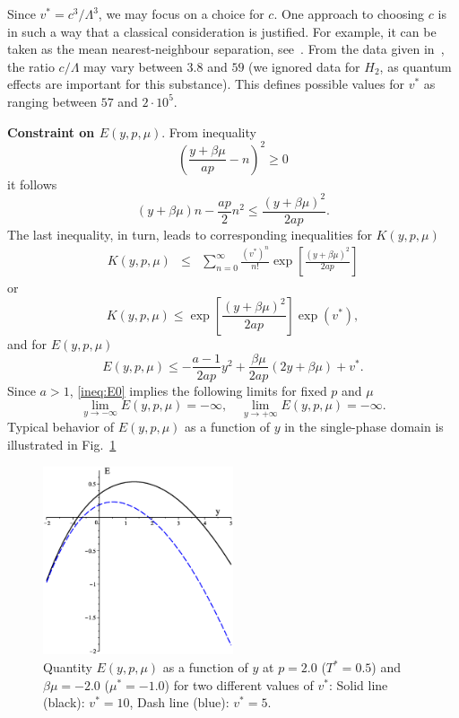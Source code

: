 \documentclass[12pt]{article}
\numberwithin{equation}{section}
\begin{document}
	Since $v^* = c^3/\Lambda^3$, we may focus on a choice for $c$. One approach to choosing $c$ is in such a way that a classical consideration is justified. For example, it can be taken as the mean nearest-neighbour separation, see~\cite[Sec.~1.1]{HansenMcDonald13}. From the data given in~\cite[Table~1.1]{HansenMcDonald13}, the ratio $c/\Lambda$ may vary between $3.8$ and $59$ (we ignored data for $H_2$, as quantum effects are important for this substance). This defines possible values for $v^*$ as ranging between $57$ and $2 \cdot 10^5$.
	
	\textbf{Constraint on $E(y,p,\mu)$}. From inequality
	\begin{equation}
		\left(\frac{y+\beta\mu}{ap} - n\right)^2 \geq 0
	\end{equation}
	it follows
	\begin{equation}
		(y+\beta\mu)n - \frac{ap}{2}n^2 \leq \frac{(y+\beta\mu)^2}{2ap}.
	\end{equation}
	The last inequality, in turn, leads to corresponding inequalities for $K(y,p,\mu)$
	\begin{eqnarray}
		K(y,p,\mu) & \leq & \sum_{n=0}^{\infty}\frac{(v^*)^n}{n!} \exp[\frac{(y+\beta\mu)^2}{2ap}]
	\end{eqnarray}
	or
	\begin{equation}
		K(y,p,\mu) \leq \exp[\frac{(y+\beta\mu)^2}{2ap}] \exp(v^*),
	\end{equation}
	and for $E(y,p,\mu)$
	\begin{equation}
		\label{ineq:E0}
		E(y,p,\mu) \leq -\frac{a-1}{2ap}y^2 + \frac{\beta\mu}{2ap}(2y+\beta\mu) + v^*.
	\end{equation}
	Since $a>1$, \eqref{ineq:E0} implies the following limits for fixed $p$ and $\mu$
	\begin{equation}
		\lim_{y \to -\infty} E(y,p,\mu) = -\infty, \quad \lim\limits_{y \to +\infty} E(y,p,\mu) = -\infty.
	\end{equation}
	Typical behavior of $E(y,p,\mu)$ as a function of $y$ in the single-phase domain is illustrated in Fig.~\ref{fig:E0_vs_y}
	\begin{figure}[htbp]
		\includegraphics[width=0.5\textwidth,angle=0]{E0_vs_y2}
		\centering
		\captionsetup{width=0.6\textwidth}
		\caption{Quantity $E(y,p,\mu)$ as a function of $y$ at $p=2.0$ ($T^*=0.5$) and $\beta\mu=-2.0$ ($\mu^*=-1.0$) for two different values of $v^*$: Solid line (black): $v^* = 10$, Dash line (blue): $v^* = 5$.}
		\label{fig:E0_vs_y}
	\end{figure}
	
\end{document}
